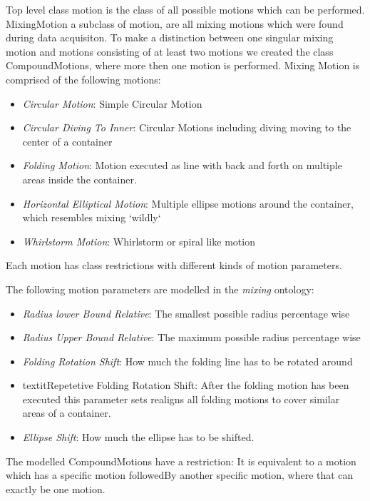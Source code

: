 Top level class motion is the class of all possible motions which can be performed. MixingMotion a subclass of motion, are all mixing motions 
which were found during data acquisiton. To make a distinction between one singular mixing motion and motions consisting of at least two motions
we created the class CompoundMotions, where more then one motion is performed. 
Mixing Motion is comprised of the following motions:

\begin{itemize}
    \item \textit{Circular Motion}: Simple Circular Motion
    \item \textit{Circular Diving To Inner}: Circular Motions including diving moving to the center of a container
    \item \textit{Folding Motion}: Motion executed as line with back and forth on multiple areas inside the container.
    \item \textit{Horizontal Elliptical Motion}: Multiple ellipse motions around the container, which resembles mixing `wildly`
    \item \textit{Whirlstorm Motion}: Whirlstorm or spiral like motion
\end{itemize}

Each motion has class restrictions with different kinds of motion parameters.

The following motion parameters are modelled in the \textit{mixing} ontology:

\begin{itemize}
    \item \textit{Radius lower Bound Relative}: The smallest possible radius percentage wise
    \item \textit{Radius Upper Bound Relative}: The maximum possible radius percentage wise
    \item \textit{Folding Rotation Shift}: How much the folding line has to be rotated around 
    \item textit{Repetetive Folding Rotation Shift}: After the folding motion has been executed this parameter sets realigns all folding motions
     to cover similar areas of a container. 
    \item \textit{Ellipse Shift}: How much the ellipse has to be shifted.
\end{itemize}

The modelled CompoundMotions have a restriction: 
It is equivalent to a motion which has a specific motion followedBy another specific motion, where that can exactly be one motion.



